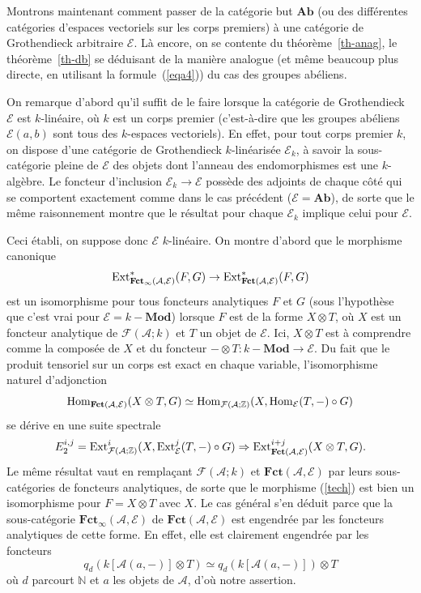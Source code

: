 \documentclass[a4paper,10pt]{article}
\newcommand{\A}{{\mathcal{A}}}
\newcommand{\F}{{\mathcal{F}}}
\newcommand{\fct}{\mathbf{Fct}}
\newcommand{\E}{{\mathcal{E}}}
\newcommand{\Pol}{\fct}
\theoremstyle{definition}
\theoremstyle{remark}
\begin{document}
\smallskip

Montrons maintenant comment passer de la catégorie but $\mathbf{Ab}$ (ou des différentes catégories d'espaces vectoriels sur les corps premiers) à une catégorie de Grothendieck arbitraire $\E$. Là encore, on se contente du théorème~\ref{th-anag}, le théorème~\ref{th-db} se déduisant de la manière analogue (et même beaucoup plus directe, en utilisant la formule~(\ref{eqa4})) du cas des groupes abéliens.

On remarque d'abord qu'il suffit de le faire lorsque la catégorie de Grothendieck $\E$ est $k$-linéaire, où $k$ est un corps premier (c'est-à-dire que les groupes abéliens $\E(a,b)$ sont tous des $k$-espaces vectoriels). En effet, pour tout corps premier $k$, on dispose d'une catégorie de Grothendieck $k$-linéarisée $\E_k$, à savoir la sous-catégorie pleine de $\E$ des objets dont l'anneau des endomorphismes est une $k$-algèbre. Le foncteur d'inclusion $\E_k\to\E$ possède des adjoints de chaque côté qui se comportent exactement comme dans le cas précédent ($\E=\mathbf{Ab}$), de sorte que le même raisonnement montre que le résultat pour chaque $\E_k$ implique celui pour $\E$.

Ceci établi, on suppose donc $\E$ $k$-linéaire. On montre d'abord que le morphisme canonique
\begin{equation}\label{tech}
 {\rm Ext}^*_{\Pol_\infty(\A,\E)}(F,G)\to {\rm Ext}^*_{\fct(\A,\E)}(F,G)
\end{equation}
est un isomorphisme pour tous foncteurs analytiques $F$ et $G$ (sous l'hypothèse que c'est vrai pour $\E=k-\mathbf{Mod}$) lorsque $F$ est de la forme $X\otimes T$, où $X$ est un foncteur analytique de $\F(\A;k)$ et $T$ un objet de $\E$. Ici, $X\otimes T$ est à comprendre comme la composée de $X$ et du foncteur $-\otimes T : k-\mathbf{Mod}\to\E$. Du fait que le produit tensoriel sur un corps est exact en chaque variable, l'isomorphisme naturel d'adjonction
$${\rm Hom}_{\fct(\A,\E)}(X\otimes T,G)\simeq {\rm Hom}_{\F(\A;\mathbb{Z})}(X,{\rm Hom}_\E(T,-)\circ G)$$
se dérive en une suite spectrale
$$E_2^{i,j}={\rm Ext}^i_{\F(\A;\mathbb{Z})}(X,{\rm Ext}^j_\E(T,-)\circ G)\Rightarrow {\rm Ext}^{i+j}_{\fct(\A,\E)}(X\otimes T,G).$$
Le même résultat vaut en remplaçant $\F(\A;k)$ et $\fct(\A,\E)$ par leurs sous-catégories de foncteurs analytiques, de sorte que le morphisme (\ref{tech}) est bien un isomorphisme pour $F=X\otimes T$ avec $X$. Le cas général s'en déduit parce que la sous-catégorie $\Pol_\infty(\A,\E)$ de $\fct(\A,\E)$ est engendrée par les foncteurs analytiques de cette forme. En effet, elle est clairement engendrée par les foncteurs
$$q_d(k[\A(a,-)]\otimes T)\simeq q_d(k[\A(a,-)])\otimes T$$
où $d$ parcourt $\mathbb{N}$ et $a$ les objets de $\A$, d'où notre assertion.
\end{document}
